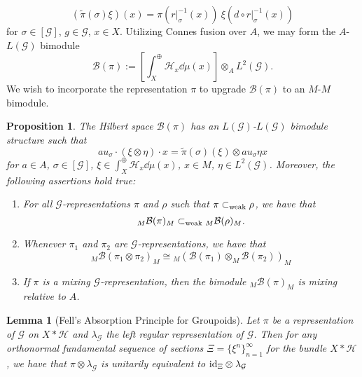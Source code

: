 \documentclass[a4paper,11pt]{article}
\numberwithin{equation}{section}
\newtheorem{lem}[thm]{Lemma}
\newtheorem{prop}[thm]{Proposition}
\theoremstyle{definition}
\theoremstyle{remark}
\numberwithin{equation}{section}
\newcommand{\rG}{\mathcal{G}}
\newcommand{\B}{\mathcal{B}}
\def\H{\mathcal H}
\newcommand{\subwk}{\subset_{\rm{weak}}}
\numberwithin{equation}{section}
\begin{document}
\[
  (\widetilde{\pi}(\sigma) \xi)(x) = \pi(r\vert_{\sigma}^{-1}(x)) \ \xi(d\circ r\vert_{\sigma}^{-1}(x))
\]
for $ \sigma\in [\rG] $, $ g\in\rG $, $ x\in X $. Utilizing Connes fusion over $ A $, we may form the $ A $-$ L(\rG) $ bimodule
\[
  \B(\pi) := \left[ \int_{X}^{\oplus}\H_{x}\dd{\mu(x)}\right] \otimes_{A} L^{2}(\rG).
\]
We wish to incorporate the representation $ \pi $ to upgrade $ \B(\pi) $ to an $ M $-$ M $ bimodule.


\begin{prop}\label{reptobim}
    The Hilbert space $ \B(\pi) $ has an $ L(\rG) $-$ L(\rG) $ bimodule structure such that 
    \[
        au_{\sigma}\cdot (\xi \otimes \eta) \cdot x = \widetilde{\pi}(\sigma)(\xi)\otimes au_{\sigma}\eta x
    \]
    for $ a\in A $, $ \sigma\in [\rG] $, $ \xi\in \int_{X}^{\oplus}\H_{x} \dd{\mu(x)} $, $ x\in M $, $ \eta\in L^{2}(\rG) $.
    Moreover, the following assertions hold true:
    \begin{enumerate}[noitemsep]
        \item For all $ \rG $-representations $\pi$ and $\rho$ such that $ \pi \subwk \rho $, we have that
            \[
                _M\B(\pi)_M \subwk {}_M\B(\rho)_M.
            \]
        \item Whenever $ \pi_{1} $ and $ \pi_{2} $ are $ \rG $-representations, we have that
            \[
                _M\B(\pi_{1}\otimes \pi_{2})_M \cong {}_M(\B(\pi_{1})\otimes_M \B(\pi_{2}))_M
            \]
        \item If $ \pi $ is a mixing $ \rG $-representation, then the bimodule $ {}_M \B(\pi)_M $ is mixing relative to $ A $.
    \end{enumerate}

\end{prop}


\begin{lem}[Fell's Absorption Principle for Groupoids]
  Let $ \pi $ be a representation of $ \rG $ on $ X\ast \H $ and $ \lambda_\rG $ the left regular representation of $ \rG $. Then for any orthonormal fundamental sequence of sections $ \Xi=\{\xi^n\}_{n=1}^\infty $ for the bundle $ X\ast \H $, we have that $ \pi\otimes \lambda_\rG $ is unitarily equivalent to $ {\rm id}_{\Xi}\otimes \lambda_\rG $
\end{lem}
\end{document}
